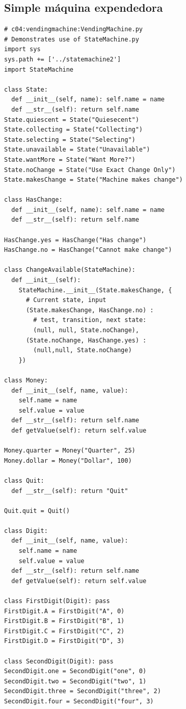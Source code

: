 \documentclass{article}
\begin{document}
\subsection{Simple máquina expendedora}

\begin{lstlisting}
# c04:vendingmachine:VendingMachine.py 
# Demonstrates use of StateMachine.py 
import sys 
sys.path += ['../statemachine2'] 
import StateMachine 

class State: 
  def __init__(self, name): self.name = name 
  def __str__(self): return self.name  
State.quiescent = State("Quiesecent") 
State.collecting = State("Collecting") 
State.selecting = State("Selecting") 
State.unavailable = State("Unavailable") 
State.wantMore = State("Want More?") 
State.noChange = State("Use Exact Change Only") 
State.makesChange = State("Machine makes change") 

class HasChange: 
  def __init__(self, name): self.name = name 
  def __str__(self): return self.name  
  
HasChange.yes = HasChange("Has change") 
HasChange.no = HasChange("Cannot make change") 

class ChangeAvailable(StateMachine): 
  def __init__(self): 
    StateMachine.__init__(State.makesChange, { 
      # Current state, input 
      (State.makesChange, HasChange.no) : 
        # test, transition, next state: 
        (null, null, State.noChange), 
      (State.noChange, HasChange.yes) : 
        (null,null, State.noChange) 
    }) 
    
class Money: 
  def __init__(self, name, value): 
    self.name = name 
    self.value = value 
  def __str__(self): return self.name  
  def getValue(self): return self.value 
  
Money.quarter = Money("Quarter", 25) 
Money.dollar = Money("Dollar", 100) 

class Quit: 
  def __str__(self): return "Quit"  
  
Quit.quit = Quit() 

class Digit: 
  def __init__(self, name, value): 
    self.name = name 
    self.value = value 
  def __str__(self): return self.name  
  def getValue(self): return self.value  
  
class FirstDigit(Digit): pass 
FirstDigit.A = FirstDigit("A", 0) 
FirstDigit.B = FirstDigit("B", 1) 
FirstDigit.C = FirstDigit("C", 2) 
FirstDigit.D = FirstDigit("D", 3) 

class SecondDigit(Digit): pass 
SecondDigit.one = SecondDigit("one", 0) 
SecondDigit.two = SecondDigit("two", 1) 
SecondDigit.three = SecondDigit("three", 2) 
SecondDigit.four = SecondDigit("four", 3) 


\end{lstlisting}
\end{document}
